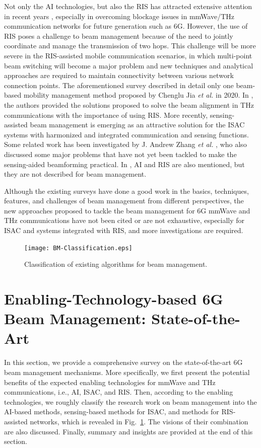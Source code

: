 \documentclass[journal,comsoc]{IEEEtran}
\begin{document}
Not only the AI technologies, but also the RIS has attracted extensive attention in recent years \cite{Joint-Optimization-Beamforming-Multi-IRS-2022,Refracting-RIS-Hybrid-Satellite-Terrestrial-Relay,IRS-Aided-Wireless-Powered-MEC-2023,CSI-Feedback}, especially in overcoming blockage issues in mmWave/THz communication networks for future generation such as 6G. However, the use of RIS poses a challenge to beam management because of the need to jointly coordinate and manage the transmission of two hops. This challenge will be more severe in the RIS-assisted mobile communication scenarios, in which multi-point beam switching will become a major problem and new techniques and analytical approaches are required to maintain connectivity between various network connection points. The aforementioned survey \cite{Beam-Based-Mobility-V2X-Survey-2021} described in detail only one beam-based mobility management method proposed by Chenglu Jia \emph{et al.} \cite{ML-beam-management-IRS} in 2020. In \cite{Initial-Access-Beam-Alignment-mmWave-Terahertz-2022}, the authors provided the solutions proposed to solve the beam alignment in THz communications with the importance of using RIS. More recently, sensing-assisted beam management is emerging as an attractive solution for the ISAC systems with harmonized and integrated communication and sensing functions. Some related work has been investigated by J. Andrew Zhang \emph{et al.} \cite{Enabling-JCAS-survey-2022}, who also discussed some major problems that have not yet been  tackled to make the sensing-aided beamforming practical. In \cite{Enabling-JCAS-survey-2022}, AI and RIS are also mentioned, but they are not described for beam management.


Although the existing surveys have done a good work in the basics, techniques, features, and challenges of beam management from different perspectives, the new approaches proposed to tackle the beam management for 6G mmWave and THz communications have not been cited or are not exhaustive, especially for ISAC and systems integrated with RIS, and more investigations are required.

\begin{figure}[t]
	\centering
	\texttt{[image: BM-Classification.eps]}
	\caption{Classification of existing algorithms for beam management.}
	\label{fig:BM-Classification}
\end{figure}


\section{Enabling-Technology-based 6G Beam Management: State-of-the-Art}
In this section, we provide a comprehensive survey on the state-of-the-art 6G beam management mechanisms. More specifically, we first present the potential benefits of the expected enabling technologies for mmWave and THz communications, i.e., AI, ISAC, and RIS. Then, according to the enabling technologies, we roughly classify the research work on beam management into the AI-based methods, sensing-based methods for ISAC, and methods for RIS-assisted networks, which is revealed in Fig.~\ref{fig:BM-Classification}. The visions of their combination are also discussed. Finally, summary and insights are provided at the end of this section.
\end{document}

